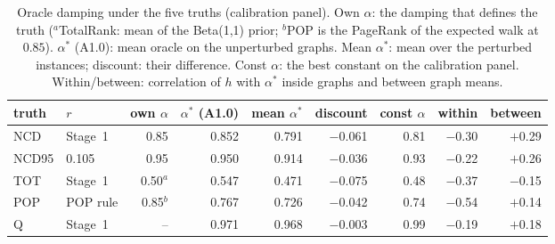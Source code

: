 \begin{table}[t]
\centering
\footnotesize
\caption{Oracle damping under the five truths (calibration panel). Own $\alpha$: the damping that defines the truth ($^{a}$TotalRank: mean of the Beta(1,1) prior; $^{b}$POP is the PageRank of the expected walk at $0.85$). $\alpha^*$ (A1.0): mean oracle on the unperturbed graphs. Mean $\alpha^*$: mean over the perturbed instances; discount: their difference. Const $\alpha$: the best constant on the calibration panel. Within/between: correlation of $h$ with $\alpha^*$ inside graphs and between graph means.}
\label{tab:anchor}
\begin{tabular}{@{}llrrrrrrr@{}}
\toprule
truth & $r$ & own $\alpha$ & $\alpha^*$ (A1.0) & mean $\alpha^*$ & discount & const $\alpha$ & within & between \\
\midrule
NCD & Stage~1 & 0.85 & 0.852 & 0.791 & $-$0.061 & 0.81 & $-$0.30 & $+$0.29 \\
NCD95 & 0.105 & 0.95 & 0.950 & 0.914 & $-$0.036 & 0.93 & $-$0.22 & $+$0.26 \\
TOT & Stage~1 & 0.50$^{a}$ & 0.547 & 0.471 & $-$0.075 & 0.48 & $-$0.37 & $-$0.15 \\
POP & POP rule & 0.85$^{b}$ & 0.767 & 0.726 & $-$0.042 & 0.74 & $-$0.54 & $+$0.14 \\
Q & Stage~1 & -- & 0.971 & 0.968 & $-$0.003 & 0.99 & $-$0.19 & $+$0.18 \\
\bottomrule
\end{tabular}
\end{table}

